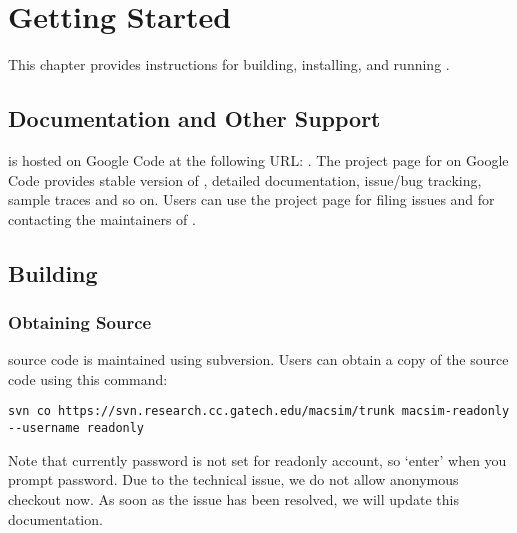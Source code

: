 

\chapter{Getting Started}


This chapter provides instructions for building, installing, and running \SIM.


\section{Documentation and Other Support}

\SIM is hosted on Google Code at the following URL:
. The project page for \SIM on
Google Code provides stable version of \SIM, detailed documentation,
issue/bug tracking, sample traces and so on. Users can use the project
page for filing issues and for contacting the maintainers of \SIM.


\section{Building \SIM}
\label{sec:installation}


\subsection{Obtaining Source}

\SIM source code is maintained using subversion. Users can obtain a copy of the
source code using this command:

\begin{Verbatim}
svn co https://svn.research.cc.gatech.edu/macsim/trunk macsim-readonly --username readonly
\end{Verbatim}

\noindent
Note that currently password is not set for readonly account, so
`enter' when you prompt password. Due to the technical issue, we do
not allow anonymous checkout now. As soon as the issue has been
resolved, we will update this documentation.

